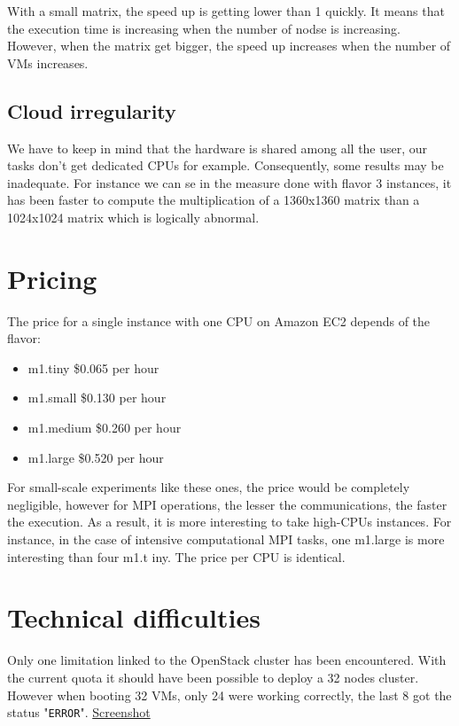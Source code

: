 \documentclass[a4paper,11pt]{article}
\begin{document}
With a small matrix, the speed up is getting lower than 1 quickly. It means
that the execution time is increasing when the number of nodse is increasing.
However, when the matrix get bigger, the speed up increases when the number
of VMs increases.

\subsection{Cloud irregularity}

We have to keep in mind that the hardware is shared among all the user, our
tasks don't get dedicated CPUs for example. Consequently, some results may be
inadequate. For instance we can se in the measure done with flavor 3 instances,
it has been faster to compute the multiplication of a 1360x1360 matrix than a
1024x1024 matrix which is logically abnormal.

\section{Pricing}

The price for a single instance with one CPU on Amazon EC2 depends of the flavor:

\begin{itemize}
 \item m1.tiny \$0.065 per hour
 \item m1.small \$0.130 per hour
 \item m1.medium \$0.260 per hour
 \item m1.large \$0.520 per hour
\end{itemize}

For small-scale experiments like these ones, the price would be completely
negligible, however for MPI operations, the lesser the communications, the
faster the execution. As a result, it is more interesting to take high-CPUs
instances. For instance, in the case of intensive computational MPI tasks, one 
m1.large is more interesting than four m1.t iny. The price per CPU is identical.

\section*{Technical difficulties}

Only one limitation linked to the OpenStack cluster has been encountered. With
the current quota it should have been possible to deploy a 32 nodes cluster.
However when booting 32 VMs, only 24 were working correctly, the last 8 got the
status "\texttt{ERROR}". \hyperref[figure:errors]{Screenshot}
\end{document}
